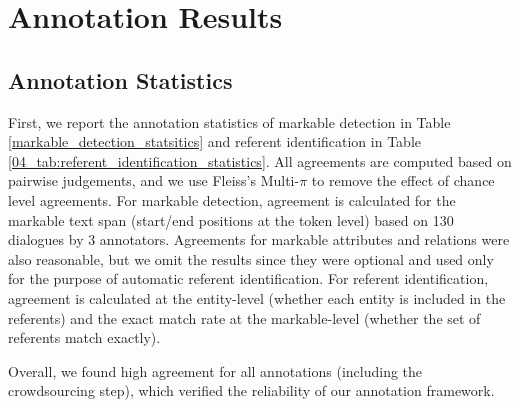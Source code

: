 \section{Annotation Results}
\label{04_sec:annotated_corpus}

\subsection{Annotation Statistics}
\label{04_subsec:agreement_statistics}

First, we report the annotation statistics of markable detection in Table \ref{markable_detection_statsitics} and referent identification in Table \ref{04_tab:referent_identification_statistics}. All agreements are computed based on pairwise judgements, and we use Fleiss's Multi-$\pi$ \citep{fleiss1971measuring} to remove the effect of chance level agreements. For markable detection, agreement is calculated for the markable text span (start/end positions at the token level) based on 130 dialogues by 3 annotators. Agreements for markable attributes and relations were also reasonable, but we omit the results since they were optional and used only for the purpose of automatic referent identification. For referent identification, agreement is calculated at the entity-level (whether each entity is included in the referents) and the exact match rate at the markable-level (whether the set of referents match exactly).

Overall, we found high agreement for all annotations (including the crowdsourcing step), which verified the reliability of our annotation framework.

\begin{table}[t!]
\centering {}
\caption{\label{markable_detection_statsitics}
Annotation statistics for markable detection. Agreement is calculated at the token level (Fleiss's Multi-$\pi$ shown in parenthesis).
}
\end{table}

